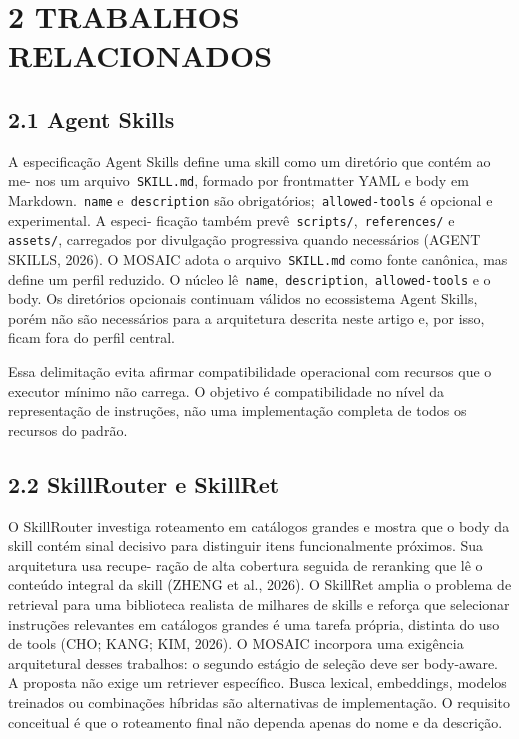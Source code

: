 \documentclass[12pt,a4paper]{article}
\begin{document}

\section*{2 TRABALHOS RELACIONADOS}

\subsection*{2.1 Agent Skills}

A especificação Agent Skills define uma skill como um diretório que contém ao me- nos um arquivo\texttt{ SKILL.md}, formado por frontmatter YAML e body em Markdown.\texttt{ name} e\texttt{ description} são obrigatórios;\texttt{ allowed-tools} é opcional e experimental. A especi- ficação também prevê\texttt{ scripts/},\texttt{ references/} e\texttt{ assets/}, carregados por divulgação progressiva quando necessários (AGENT SKILLS, 2026). O MOSAIC adota o arquivo\texttt{ SKILL.md} como fonte canônica, mas define um perfil reduzido. O núcleo lê\texttt{ name},\texttt{ description},\texttt{ allowed-tools} e o body. Os diretórios opcionais continuam válidos no ecossistema Agent Skills, porém não são necessários para a arquitetura descrita neste artigo e, por isso, ficam fora do perfil central.


Essa delimitação evita afirmar compatibilidade operacional com recursos que o executor mínimo não carrega. O objetivo é compatibilidade no nível da representação de instruções, não uma implementação completa de todos os recursos do padrão.


\subsection*{2.2 SkillRouter e SkillRet}

O SkillRouter investiga roteamento em catálogos grandes e mostra que o body da skill contém sinal decisivo para distinguir itens funcionalmente próximos. Sua arquitetura usa recupe- ração de alta cobertura seguida de reranking que lê o conteúdo integral da skill (ZHENG et al., 2026). O SkillRet amplia o problema de retrieval para uma biblioteca realista de milhares de skills e reforça que selecionar instruções relevantes em catálogos grandes é uma tarefa própria, distinta do uso de tools (CHO; KANG; KIM, 2026). O MOSAIC incorpora uma exigência arquitetural desses trabalhos: o segundo estágio de seleção deve ser body-aware. A proposta não exige um retriever específico. Busca lexical, embeddings, modelos treinados ou combinações híbridas são alternativas de implementação. O requisito conceitual é que o roteamento final não dependa apenas do nome e da descrição.
\end{document}
